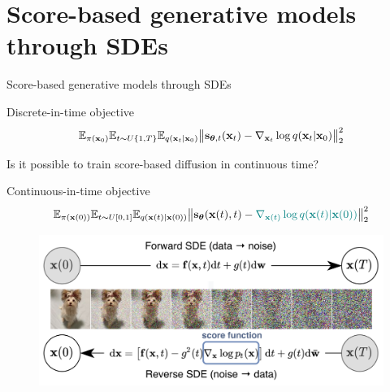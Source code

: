 \section{Score-based generative models through SDEs}
\begin{frame}{Score-based generative models through SDEs}
	\begin{block}{Discrete-in-time objective}
		\vspace{-0.3cm}
		\[
			\mathbb{E}_{\pi(\mathbf{x}_0)} \mathbb{E}_{t \sim U\{1, T\}} \mathbb{E}_{q(\mathbf{x}_t | \mathbf{x}_0)}\bigl\| \mathbf{s}_{\boldsymbol{\theta}, t}(\mathbf{x}_t) - \nabla_{\mathbf{x}_t} \log q(\mathbf{x}_t | \mathbf{x}_0) \bigr\|^2_2 
		\]
		\vspace{-0.3cm}
	\end{block}
	Is it possible to train score-based diffusion in continuous time?
	\begin{block}{Continuous-in-time objective}
		\vspace{-0.7cm}
		\[
			\mathbb{E}_{\pi(\mathbf{x}(0))} \mathbb{E}_{t \sim U[0, 1]} \mathbb{E}_{q(\mathbf{x}(t) | \mathbf{x}(0))}\bigl\| \mathbf{s}_{\boldsymbol{\theta}}(\mathbf{x}(t), t) - {\color{teal}\nabla_{\mathbf{x}(t)} \log q(\mathbf{x}(t) | \mathbf{x}(0))} \bigr\|^2_2 
		\]
		\vspace{-0.7cm}
	\end{block}
	\begin{figure}
		\includegraphics[width=0.8\linewidth]{figs/sbgm}
	\end{figure}
\end{frame}
